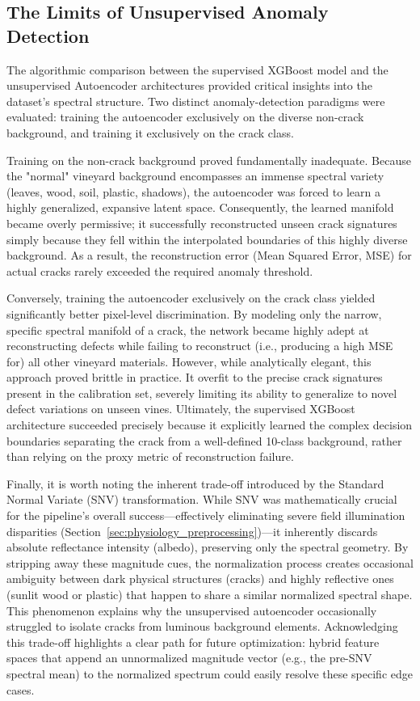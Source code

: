 \subsection{The Limits of Unsupervised Anomaly Detection}
\noindent
The algorithmic comparison between the supervised XGBoost model and the unsupervised Autoencoder architectures provided critical insights into the dataset's spectral structure. Two distinct anomaly-detection paradigms were evaluated: training the autoencoder exclusively on the diverse non-crack background, and training it exclusively on the crack class. 

\medskip\noindent
Training on the non-crack background proved fundamentally inadequate. Because the "normal" vineyard background encompasses an immense spectral variety (leaves, wood, soil, plastic, shadows), the autoencoder was forced to learn a highly generalized, expansive latent space. Consequently, the learned manifold became overly permissive; it successfully reconstructed unseen crack signatures simply because they fell within the interpolated boundaries of this highly diverse background. As a result, the reconstruction error (Mean Squared Error, MSE) for actual cracks rarely exceeded the required anomaly threshold.

\medskip\noindent
Conversely, training the autoencoder exclusively on the crack class yielded significantly better pixel-level discrimination. By modeling only the narrow, specific spectral manifold of a crack, the network became highly adept at reconstructing defects while failing to reconstruct (i.e., producing a high MSE for) all other vineyard materials. However, while analytically elegant, this approach proved brittle in practice. It overfit to the precise crack signatures present in the calibration set, severely limiting its ability to generalize to novel defect variations on unseen vines. Ultimately, the supervised XGBoost architecture succeeded precisely because it explicitly learned the complex decision boundaries separating the crack from a well-defined 10-class background, rather than relying on the proxy metric of reconstruction failure.

\medskip\noindent
Finally, it is worth noting the inherent trade-off introduced by the Standard Normal Variate (SNV) transformation. While SNV was mathematically crucial for the pipeline's overall success---effectively eliminating severe field illumination disparities (Section~\ref{sec:physiology_preprocessing})---it inherently discards absolute reflectance intensity (albedo), preserving only the spectral geometry. By stripping away these magnitude cues, the normalization process creates occasional ambiguity between dark physical structures (cracks) and highly reflective ones (sunlit wood or plastic) that happen to share a similar normalized spectral shape. This phenomenon explains why the unsupervised autoencoder occasionally struggled to isolate cracks from luminous background elements. Acknowledging this trade-off highlights a clear path for future optimization: hybrid feature spaces that append an unnormalized magnitude vector (e.g., the pre-SNV spectral mean) to the normalized spectrum could easily resolve these specific edge cases.


